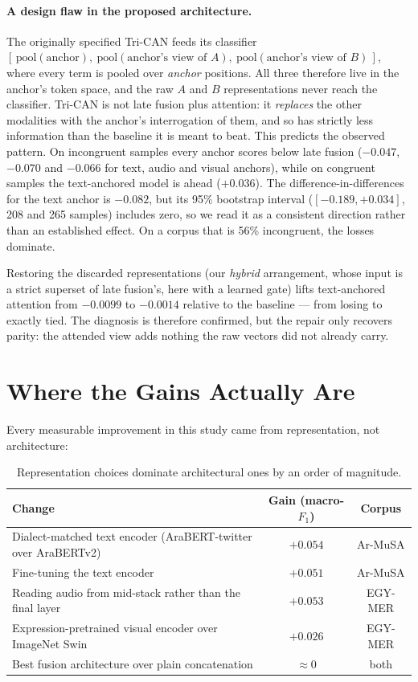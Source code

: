 \documentclass[12pt, a4paper]{article}
\begin{document}
\paragraph{A design flaw in the proposed architecture.} The originally specified
Tri-CAN feeds its classifier
$[\,\text{pool}(\text{anchor}),\ \text{pool}(\text{anchor's view of }A),\
\text{pool}(\text{anchor's view of }B)\,]$, where every term is pooled over
\emph{anchor} positions. All three therefore live in the anchor's token space,
and the raw $A$ and $B$ representations never reach the classifier. Tri-CAN is
not late fusion plus attention: it \emph{replaces} the other modalities with the
anchor's interrogation of them, and so has strictly less information than the
baseline it is meant to beat. This predicts the observed pattern. On
incongruent samples every anchor scores below late fusion ($-0.047$, $-0.070$ and
$-0.066$ for text, audio and visual anchors), while on congruent samples the
text-anchored model is ahead ($+0.036$). The difference-in-differences for the
text anchor is $-0.082$, but its 95\% bootstrap interval ($[-0.189, +0.034]$,
208 and 265 samples) includes zero, so we read it as a consistent direction
rather than an established effect. On a corpus that is 56\% incongruent, the
losses dominate.

Restoring the discarded representations (our \emph{hybrid} arrangement, whose
input is a strict superset of late fusion's, here with a learned gate) lifts
text-anchored attention from
$-0.0099$ to $-0.0014$ relative to the baseline --- from losing to exactly tied.
The diagnosis is therefore confirmed, but the repair only recovers parity: the
attended view adds nothing the raw vectors did not already carry.

\section{Where the Gains Actually Are}
\label{sec:encoders}

Every measurable improvement in this study came from representation, not
architecture:

\begin{table}[h]
\centering
\begin{tabular}{lcc}
\toprule
\textbf{Change} & \textbf{Gain (macro-$F_1$)} & \textbf{Corpus} \\
\midrule
Dialect-matched text encoder (AraBERT-twitter over AraBERTv2) & $+0.054$ & Ar-MuSA \\
Fine-tuning the text encoder & $+0.051$ & Ar-MuSA \\
Reading audio from mid-stack rather than the final layer & $+0.053$ & EGY-MER \\
Expression-pretrained visual encoder over ImageNet Swin & $+0.026$ & EGY-MER \\
\midrule
Best fusion architecture over plain concatenation & $\approx 0$ & both \\
\bottomrule
\end{tabular}
\caption{Representation choices dominate architectural ones by an order of
magnitude.}
\label{tab:gains}
\end{table}
\end{document}
